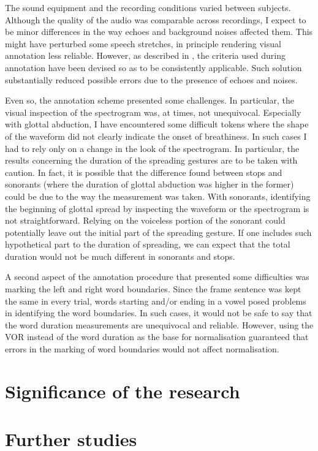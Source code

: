 \documentclass[11pt,a4paper,openany]{memoir}\usepackage[]{graphicx}\usepackage[]{color}
\begin{document}
The sound equipment and the recording conditions varied between subjects.
Although the quality of the audio was comparable across recordings, I expect to be minor differences in the way echoes and background noises affected them.
This might have perturbed some speech stretches, in principle rendering visual annotation less reliable.
However, as described in , the criteria used during annotation have been devised so as to be consistently applicable.
Such solution substantially reduced possible errors due to the presence of echoes and noises.

Even so, the annotation scheme presented some challenges.
In particular, the visual inspection of the spectrogram was, at times, not unequivocal.
Especially with glottal abduction, I have encountered some difficult tokens where the shape of the waveform did not clearly indicate the onset of breathiness.
In such cases I had to rely only on a change in the look of the spectrogram.
In particular, the results concerning the duration of the spreading gestures are to be taken with caution.
In fact, it is possible that the difference found between stops and sonorants (where the duration of glottal abduction was higher in the former) could be due to the way the measurement was taken.
With sonorants, identifying the beginning of glottal spread by inspecting the waveform or the spectrogram is not straightforward.
Relying on the voiceless portion of the sonorant could potentially leave out the initial part of the spreading gesture.
If one includes such hypothetical part to the duration of spreading, we can expect that the total duration would not be much different in sonorants and stops.

A second aspect of the annotation procedure that presented some difficulties was marking the left and right word boundaries.
Since the frame sentence was kept the same in every trial, words starting and/or ending in a vowel posed problems in identifying the word boundaries.
In such cases, it would not be safe to say that the word duration measurements are unequivocal and reliable.
However, using the VOR instead of the word duration as the base for normalisation guaranteed that errors in the marking of word boundaries would not affect normalisation.

\section{Significance of the research}

\section{Further studies}
\end{document}
